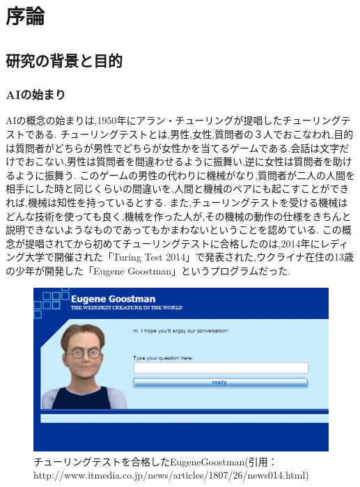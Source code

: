 \chapter{序論}
\section{研究の背景と目的}
\subsection{AIの始まり}
AIの概念の始まりは,1950年にアラン・チューリングが提唱したチューリングテストである.\cite{ronbun1}
チューリングテストとは,男性,女性,質問者の３人でおこなわれ,目的は質問者がどちらが男性でどちらが女性かを当てるゲームである.会話は文字だけでおこない,男性は質問者を間違わせるように振舞い,逆に女性は質問者を助けるように振舞う.
このゲームの男性の代わりに機械がなり,質問者が二人の人間を相手にした時と同じくらいの間違いを,人間と機械のペアにも起こすことができれば,機械は知性を持っているとする.
また,チューリングテストを受ける機械はどんな技術を使っても良く,機械を作った人が,その機械の動作の仕様をきちんと説明できないようなものであってもかまわないということを認めている.
この概念が提唱されてから初めてチューリングテストに合格したのは,2014年にレディング大学で開催された「Turing Test 2014」で発表された,ウクライナ在住の13歳の少年が開発した「Eugene Goostman」というプログラムだった.
\begin{figure}[!ht]
    \begin{screen}
    \begin{center}
        \includegraphics[scale=0.6, clip]{./img/Eugene_Goostman.jpg}
        \caption{チューリングテストを合格したEugeneGoostman\newline(引用：http://www.itmedia.co.jp/news/articles/1807/26/news014.html)}
        \label{fig:チューリングテストを合格したEugeneGoostman}
    \end{center}
\end{screen}
\end{figure}
